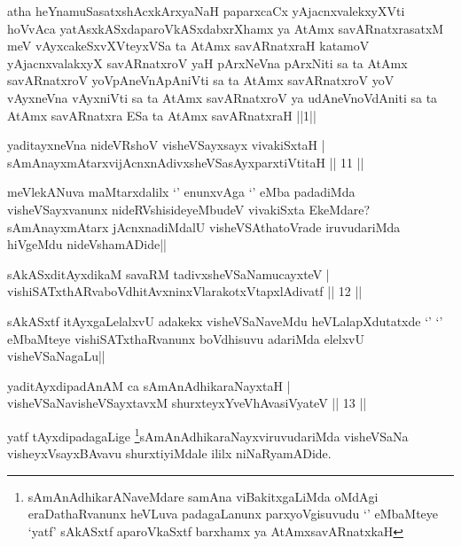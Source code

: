 \begin{shl}
atha heYnamuSasatxshAcxkArxyaNaH paparxcaCx yAjacnxvalekxyXVti hoVvAca yatAsxkASxdaparoVkASxdabxrXhamx ya AtAmx savARnatxrasatxM meV vAyxcakeSxvXVteyxVSa ta AtAmx savARnatxraH katamoV yAjacnxvalakxyX savARnatxroV yaH pArxNeVna pArxNiti sa ta AtAmx savARnatxroV yoV\s pAneVnApAniVti sa ta AtAmx savARnatxroV yoV vAyxneVna vAyxniVti sa ta AtAmx savARnatxroV ya udAneVnoVdAniti sa ta AtAmx savARnatxra ESa ta AtAmx savARnatxraH ||1||
\end{shl}


\begin{shl}
yaditayxneVna nideVRshoV visheVSayxsayx vivakiSxtaH |\\
sAmAnayxmAtarxvijAcnxnAdivxsheVSasAyxparxtiVtitaH \hfill || 11 ||
\end{shl}

\begin{artha}
meVlekANuva maMtarxdalilx `\stext' enunxvAga `\stext' eMba padadiMda visheVSayxvanunx nideRVshisideyeMbudeV vivakiSxta EkeMdare? sAmAnayxmAtarx jAcnxnadiMdalU visheVSAthatoVrade iruvudariMda hiVgeMdu nideVshamADide||
\end{artha}

\begin{shl}
sAkASxditAyxdikaM savaRM tadivxsheVSaNamucayxteV |\\
vishiSATxthARvaboVdhitAvxninxVlarakotxVtapxlAdivatf \hfill || 12 ||
\end{shl}

\begin{artha}
sAkASxtf itAyxgaLelalxvU adakekx visheVSaNaveMdu heVLalapXdutatxde `\stext' `\stext' eMbaMteye vishiSATxthaRvanunx boVdhisuvu adariMda elelxvU visheVSaNagaLu||
\end{artha}

\begin{shl}
yaditAyxdipadAnAM ca sAmAnAdhikaraNayxtaH |\\
visheVSaNavisheVSayxtavxM shurxteyxYveVhAvasiVyateV \hfill || 13 ||
\end{shl}

\begin{artha}
yatf tAyxdipadagaLige \footnote{sAmAnAdhikarANaveMdare samAna viBakitxgaLiMda oMdAgi eraDathaRvanunx heVLuva padagaLanunx parxyoVgisuvudu `\stext' eMbaMteye `yatf' sAkASxtf aparoVkaSxtf barxhamx ya AtAmxsavARnatxkaH}sAmAnAdhikaraNayxviruvudariMda visheVSaNa visheyxVsayxBAvavu shurxtiyiMdale ililx niNaRyamADide.
\end{artha}

